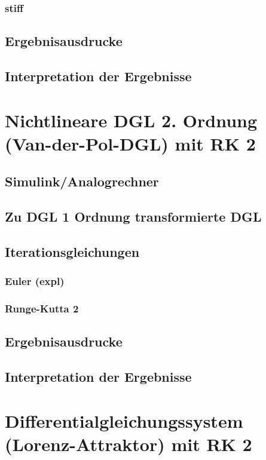 \documentclass[10pt]{scrartcl}
\begin{document}
		\subsubsection{stiff}		
		
	\subsection{Ergebnisausdrucke}	
		
	\subsection{Interpretation der Ergebnisse}		
		

\section{Nichtlineare DGL 2. Ordnung (Van-der-Pol-DGL) mit RK 2}
	\subsection{Simulink/Analogrechner}
	
	\subsection{Zu DGL 1 Ordnung transformierte DGL}
	
	\subsection{Iterationsgleichungen}
		\subsubsection{Euler (expl)}	
	
		\subsubsection{Runge-Kutta 2}	
		
	\subsection{Ergebnisausdrucke}	
		
	\subsection{Interpretation der Ergebnisse}	
	
\section{Differentialgleichungssystem (Lorenz-Attraktor) mit RK 2}	
\end{document}
